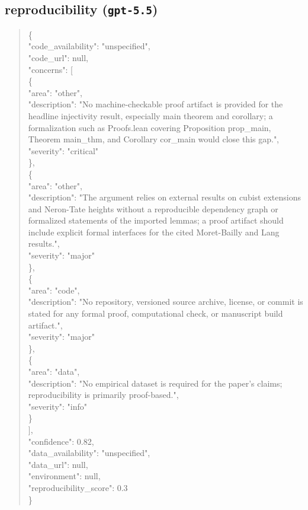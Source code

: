 \documentclass[11pt]{article}
\begin{document}
\subsection*{reproducibility (\texttt{gpt-5.5})}
\begin{quote}\small\ttfamily\raggedright
\{\\
  "code\_availability": "unspecified",\\
  "code\_url": null,\\
  "concerns": [\\
    \{\\
      "area": "other",\\
      "description": "No machine-checkable proof artifact is provided for the headline injectivity result, especially main theorem and corollary; a formalization such as Proofs.lean covering Proposition prop\_main, Theorem main\_thm, and Corollary cor\_main would close this gap.",\\
      "severity": "critical"\\
    \},\\
    \{\\
      "area": "other",\\
      "description": "The argument relies on external results on cubist extensions and Neron-Tate heights without a reproducible dependency graph or formalized statements of the imported lemmas; a proof artifact should include explicit formal interfaces for the cited Moret-Bailly and Lang results.",\\
      "severity": "major"\\
    \},\\
    \{\\
      "area": "code",\\
      "description": "No repository, versioned source archive, license, or commit is stated for any formal proof, computational check, or manuscript build artifact.",\\
      "severity": "major"\\
    \},\\
    \{\\
      "area": "data",\\
      "description": "No empirical dataset is required for the paper's claims; reproducibility is primarily proof-based.",\\
      "severity": "info"\\
    \}\\
  ],\\
  "confidence": 0.82,\\
  "data\_availability": "unspecified",\\
  "data\_url": null,\\
  "environment": null,\\
  "reproducibility\_score": 0.3\\
\}\\
\end{quote}
\end{document}
